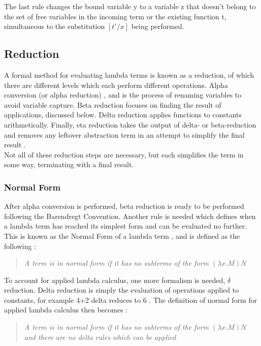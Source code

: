 \documentclass[a4paper,11pt]{report}
\begin{document}
The last rule changes the bound variable y to a variable z that doesn’t belong to the set of free variables in the incoming term or the existing function t, simultaneous to the substitution $[t' / x]$ being performed.

\subsection{Reduction}

A formal method for evaluating lambda terms is known as a reduction, of which there are different levels which each perform different operations. Alpha conversion (or alpha reduction) \cite{Horowitz2013}, and is the process of renaming variables to avoid variable capture. Beta reduction focuses on finding the result of applications, discussed below. Delta reduction applies functions to constants arithmetically. Finally, eta reduction takes the output of delta- or beta-reduction and removes any leftover abstraction term in an attempt to simplify the final result \cite{Sookocheff2018Eta}.\\

Not all of these reduction steps are necessary, but each simplifies the term in some way, terminating with a final result.

\subsubsection{Normal Form}

After alpha conversion is performed, beta reduction is ready to be performed following the Barendregt Convention. Another rule is needed which defines when a lambda term has reached its simplest form and can be evaluated no further. This is known as the Normal Form of a lambda term \cite{Barendregt2000}, and is defined as the following \cite{Hankin2004}:

\begin{quote}
	\centering
	\textit{A term is in normal form if it has no subterms of the form $(\lambda x.M)N$}
\end{quote}

To account for applied lambda calculus, one more formalism is needed, $\delta$ reduction. Delta reduction is simply the evaluation of operations applied to constants, for example 4+2 delta reduces to 6 \cite{Slonneger1995} \cite{Scott2016}. The definition of normal form for applied lambda calculus then becomes \cite{Hankin2004} \cite{Slonneger1995}:

\begin{quote}
	\centering
	\textit{A term is in normal form if it has no subterms of the form $(\lambda x.M)N$ and there are no delta rules which can be applied}
\end{quote}
\end{document}
